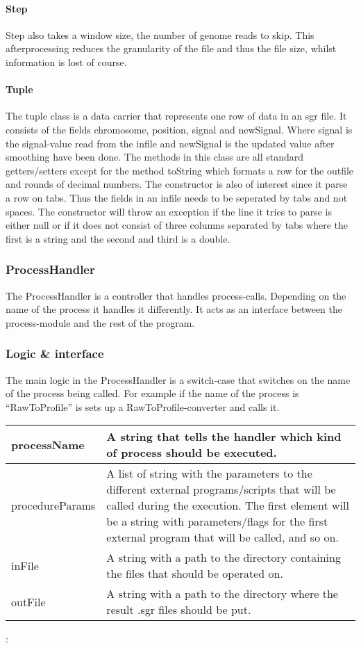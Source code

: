 \paragraph{Step}
Step also takes a window size, the number of genome reads to skip. 
This afterprocessing reduces the granularity of the file and thus the file size, whilst information is lost of course.


\paragraph{Tuple}
The tuple class is a data carrier that represents one row of data in an sgr file. It consists of the fields chromosome, position, signal and newSignal. Where signal is the signal-value read from the infile and newSignal is the updated value after smoothing have been done.
The methods in this class are all standard getters/setters except for the method toString which formats a row for the outfile and rounds of decimal numbers. The constructor is also of interest since it parse a row on tabs. Thus the fields in an infile needs to be seperated by tabs and not spaces. The constructor will throw an exception if the line it tries to parse is either null or if it does not consist of three columns separated by tabs where the first is a string and the second and third is a double.


\subsubsection{ProcessHandler}
The ProcessHandler is a controller that handles process-calls. Depending on the name of the process it handles it differently. It acts as an interface between the process-module and the rest of the program. 


\subsubsection{Logic \& interface}
The main logic in the ProcessHandler is a switch-case that switches on the name of the process being called. For example if the name of the process is “RawToProfile” is sets up a RawToProfile-converter and calls it. 

\begin{tabular}{|l| p{7cm}|}
\hline
processName & A string that tells the handler which kind of process should be
executed. \\ \hline
procedureParams & A list of string with the parameters to the different external
programs/scripts that will be called during the execution. The first element
will be a string with parameters/flags for the first external program that will
be called, and so on. \\ \hline
inFile & A string with a path to the directory containing the files that should
be operated on. \\ \hline
outFile & A string with a path to the directory where the result .sgr files
should be put. \\ \hline
\end{tabular}



:
